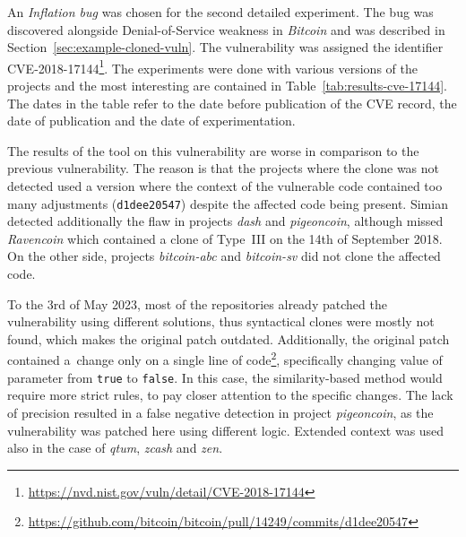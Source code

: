 An \emph{Inflation bug} was chosen for the second detailed experiment. The bug was discovered alongside Denial-of-Service weakness
in \emph{Bitcoin} and was described in Section~\ref{sec:example-cloned-vuln}. The vulnerability was assigned the identifier
CVE-2018-17144\footnote{\href{https://nvd.nist.gov/vuln/detail/CVE-2018-17144}{https://nvd.nist.gov/vuln/detail/CVE-2018-17144}}.
The experiments were done with various versions of the projects and the most interesting are contained
in Table~\ref{tab:results-cve-17144}. The dates in the table refer to the date before publication of the CVE record, the date
of publication and the date of experimentation.

The results of the tool on this vulnerability are worse in comparison to the previous vulnerability. The reason is that the projects where
the clone was not detected used a version where the context of the vulnerable code contained too many adjustments (\texttt{d1dee20547}) despite the affected code being present. Simian detected additionally
the flaw in projects \emph{dash} and \emph{pigeoncoin}, although missed \emph{Ravencoin} which contained a clone of Type~III
on the 14th of September 2018. On the other side, projects \emph{bitcoin-abc} and \emph{bitcoin-sv} did not clone the affected
code.

To the 3rd of May 2023, most of the repositories already patched the vulnerability using different solutions, thus syntactical
clones were mostly not found, which makes the original patch outdated. Additionally, the original patch contained a~change only on
a single line of code\footnote{\href{https://github.com/bitcoin/bitcoin/pull/14249/commits/d1dee20547}
{https://github.com/bitcoin/bitcoin/pull/14249/commits/d1dee20547}}, specifically changing
value of parameter from \texttt{true} to \texttt{false}. In this case, the similarity-based method would require more strict rules, to pay closer attention to the specific changes.
The lack of precision resulted in a false negative detection in project \emph{pigeoncoin}, as the vulnerability was
patched here using different logic. Extended context was used also in the case of \emph{qtum}, \emph{zcash}
and \emph{zen}.

